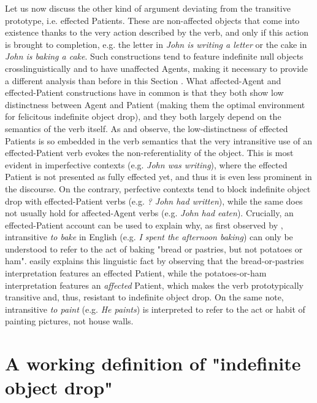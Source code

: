 Let us now discuss the other kind of argument deviating from the transitive prototype, i.e. effected Patients. These are non-affected objects that come into existence thanks to the very action described by the verb, and only if this action is brought to completion, e.g. the letter in \textit{John is writing a letter} or the cake in \textit{John is baking a cake}. Such constructions tend to feature indefinite null objects crosslinguistically and to have unaffected Agents, making it necessary to provide a different analysis than before in this Section \parencite[127-128]{Naess2007}. What affected-Agent and effected-Patient constructions have in common is that they both show low distinctness between Agent and Patient (making them the optimal environment for felicitous indefinite object drop), and they both largely depend on the semantics of the verb itself. As \textcite[127]{Naess2007} and \textcite[421]{Naess2011} observe, the low-distinctness of effected Patients is so embedded in the verb semantics that the very intransitive use of an effected-Patient verb evokes the non-referentiality of the object. This is most evident in imperfective contexts (e.g. \textit{John was writing}), where the effected Patient is not presented as fully effected yet, and thus it is even less prominent in the discourse. On the contrary, perfective contexts tend to block indefinite object drop with effected-Patient verbs (e.g. \textit{? John had written}), while the same does not usually hold for affected-Agent verbs (e.g. \textit{John had eaten}). Crucially, an effected-Patient account can be used to explain why, as first observed by \textcite[96]{Fillmore1986}, intransitive \textit{to bake} in English (e.g. \textit{I spent the afternoon baking}) can only be understood to refer to the act of baking "bread or pastries, but not potatoes or ham". \textcite[135]{Naess2007} easily explains this linguistic fact by observing that the bread-or-pastries interpretation features an effected Patient, while the potatoes-or-ham interpretation features an \textit{affected} Patient, which makes the verb prototypically transitive and, thus, resistant to indefinite object drop. On the same note, intransitive \textit{to paint} (e.g. \textit{He paints}) is interpreted to refer to the act or habit of painting pictures, not house walls.


\section{A working definition of "indefinite object drop"} 


